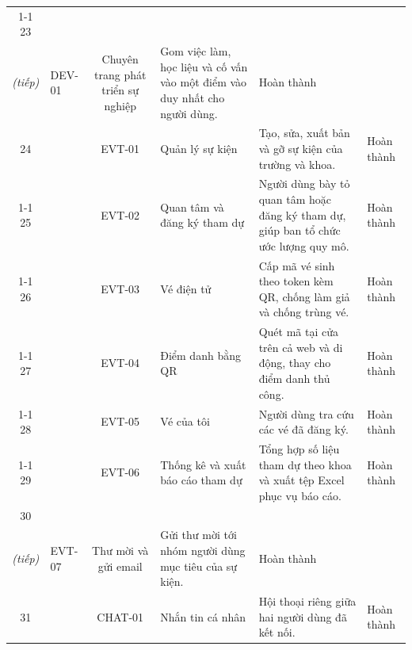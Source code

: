 \documentclass[12pt,a4paper,oneside]{report}
\begin{document}
\begin{landscape}
\begin{longtable}{|c|>{\raggedright\arraybackslash}p{3.1cm}|c|>{\raggedright\arraybackslash}p{4.6cm}|>{\raggedright\arraybackslash}p{8.4cm}|>{\raggedright\arraybackslash}p{2.4cm}|}
\cline{1-1}\cline{3-6}
\cellcolor{oldrow}23 & \multirow{-2}{2.4cm}{\cellcolor{oldrow}\textbf{Nội dung và việc làm\\\textit{(tiếp)}}} & \cellcolor{oldrow}DEV-01 & \cellcolor{oldrow}Chuyên trang phát triển sự nghiệp & \cellcolor{oldrow}Gom việc làm, học liệu và cố vấn vào một điểm vào duy nhất cho người dùng. & \cellcolor{oldrow}Hoàn thành \\
\hline
\cellcolor{oldrow}24 & \cellcolor{oldrow} & \cellcolor{oldrow}EVT-01 & \cellcolor{oldrow}Quản lý sự kiện & \cellcolor{oldrow}Tạo, sửa, xuất bản và gỡ sự kiện của trường và khoa. & \cellcolor{oldrow}Hoàn thành \\
\cline{1-1}\cline{3-6}
\cellcolor{oldrow}25 & \cellcolor{oldrow} & \cellcolor{oldrow}EVT-02 & \cellcolor{oldrow}Quan tâm và đăng ký tham dự & \cellcolor{oldrow}Người dùng bày tỏ quan tâm hoặc đăng ký tham dự, giúp ban tổ chức ước lượng quy mô. & \cellcolor{oldrow}Hoàn thành \\
\cline{1-1}\cline{3-6}
\cellcolor{oldrow}26 & \cellcolor{oldrow} & \cellcolor{oldrow}EVT-03 & \cellcolor{oldrow}Vé điện tử & \cellcolor{oldrow}Cấp mã vé sinh theo token kèm QR, chống làm giả và chống trùng vé. & \cellcolor{oldrow}Hoàn thành \\
\cline{1-1}\cline{3-6}
\cellcolor{oldrow}27 & \cellcolor{oldrow} & \cellcolor{oldrow}EVT-04 & \cellcolor{oldrow}Điểm danh bằng QR & \cellcolor{oldrow}Quét mã tại cửa trên cả web và di động, thay cho điểm danh thủ công. & \cellcolor{oldrow}Hoàn thành \\
\cline{1-1}\cline{3-6}
\cellcolor{oldrow}28 & \cellcolor{oldrow} & \cellcolor{oldrow}EVT-05 & \cellcolor{oldrow}Vé của tôi & \cellcolor{oldrow}Người dùng tra cứu các vé đã đăng ký. & \cellcolor{oldrow}Hoàn thành \\
\cline{1-1}\cline{3-6}
\cellcolor{oldrow}29 & \multirow{-6}{2.4cm}{\cellcolor{oldrow}\textbf{Sự kiện}} & \cellcolor{oldrow}EVT-06 & \cellcolor{oldrow}Thống kê và xuất báo cáo tham dự & \cellcolor{oldrow}Tổng hợp số liệu tham dự theo khoa và xuất tệp Excel phục vụ báo cáo. & \cellcolor{oldrow}Hoàn thành \\
\hline
\cellcolor{oldrow}30 & \multirow{-1}{2.4cm}{\cellcolor{oldrow}\textbf{Sự kiện\\\textit{(tiếp)}}} & \cellcolor{oldrow}EVT-07 & \cellcolor{oldrow}Thư mời và gửi email & \cellcolor{oldrow}Gửi thư mời tới nhóm người dùng mục tiêu của sự kiện. & \cellcolor{oldrow}Hoàn thành \\
\hline
\cellcolor{oldrow}31 & \cellcolor{oldrow} & \cellcolor{oldrow}CHAT-01 & \cellcolor{oldrow}Nhắn tin cá nhân & \cellcolor{oldrow}Hội thoại riêng giữa hai người dùng đã kết nối. & \cellcolor{oldrow}Hoàn thành \\

\end{longtable}
\end{landscape}
\end{document}
